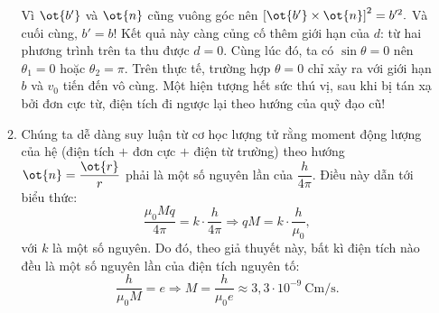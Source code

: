 \begin{loigiai}
\begin{enumerate}[1)]
\begin{enumerate}[1)]
Vì $\ot{b'}$ và $\ot{n}$ cũng vuông góc nên $\left[\ot{b'} \times \ot{n}\right]^2 = b'^2.$ Và cuối cùng, $b'=b$! Kết quả này càng củng cố thêm giới hạn của $d$: từ hai phương trình trên ta thu được $d=0$. Cùng lúc đó, ta có $\sin \theta =0$ nên $\theta_1 =0$ hoặc $\theta_2 = \pi$. Trên thực tế, trường hợp $\theta =0$ chỉ xảy ra với giới hạn $b$ và $v_0$ tiến đến vô cùng. Một hiện tượng hết sức thú vị, sau khi bị tán xạ bởi đơn cực từ, điện tích đi ngược lại theo hướng của quỹ đạo cũ!
\item Chúng ta dễ dàng suy luận từ cơ học lượng tử rằng moment động lượng của hệ (điện tích $+$ đơn cực $+$ điện từ trường) theo hướng $\ot{n} = \dfrac{\ot{r}}{r} $ phải là một số nguyên lần của $\dfrac{h}{4\pi}$. Điều này dẫn tới biểu thức:
$$\dfrac{\mu_0 Mq}{4\pi} = k \cdot \dfrac{h}{4\pi} \Rightarrow qM = k\cdot \dfrac{h}{\mu_0 },$$
với $k$ là một số nguyên. Do đó, theo giả thuyết này, bất kì điện tích nào đều là một số nguyên lần của điện tích nguyên tố:
$$\dfrac{h}{\mu_0 M} = e \Rightarrow M = \dfrac{h}{\mu_0 e} \approx 3,3 \cdot 10^{-9} ~\mathrm{Cm/s}.$$
\end{enumerate}


  \end{enumerate}

  

\end{loigiai}